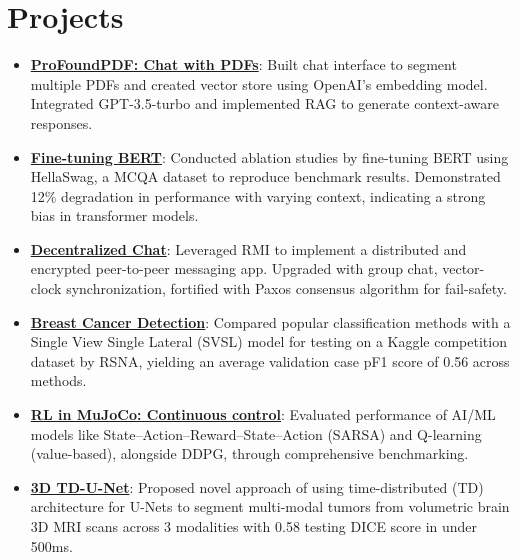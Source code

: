 \documentclass[letterpaper,10pt]{article}
\newcommand{\resumeItem}[2]{
    \item\small{
        \textbf{#1}{: #2 \vspace{-2pt}}
    }
}
\newcommand{\resumeSubItem}[2]{\resumeItem{#1}{#2}\vspace{-4pt}}
\newcommand{\resumeSubHeadingListStart}{\begin{itemize}[leftmargin=*]}
\newcommand{\resumeSubHeadingListEnd}{\end{itemize}}
\begin{document}
\section{Projects}
	\resumeSubHeadingListStart
		\resumeSubItem{\href{https://github.com/killerpanda101/ProfoundPDF}{ProFoundPDF: Chat with PDFs}}
			{Built chat interface to segment multiple PDFs and created vector store using OpenAI’s embedding model. Integrated GPT-3.5-turbo and implemented RAG to generate context-aware responses.}
		\resumeSubItem{\href{https://expo.baulab.info/2023-Fall/chandrakommineni/}{Fine-tuning BERT}}
			{Conducted ablation studies by fine-tuning BERT using HellaSwag, a MCQA dataset to reproduce benchmark results. Demonstrated 12\% degradation in performance with varying context, indicating a strong bias in transformer models.}
		\resumeSubItem{\href{https://github.com/chakrabortyde/decentralized-chat}{Decentralized Chat}}
			{Leveraged RMI to implement a distributed and encrypted peer-to-peer messaging app. Upgraded with group chat, vector-clock synchronization, fortified with Paxos consensus algorithm for fail-safety.}
		\resumeSubItem{\href{https://arxiv.org/abs/2307.11274}{Breast Cancer Detection}}
			{Compared popular classification methods with a Single View Single Lateral (SVSL) model for testing on a Kaggle competition dataset by RSNA, yielding an average validation case pF1 score of 0.56 across methods.}
		\resumeSubItem{\href{https://arxiv.org/abs/2307.11166}{RL in MuJoCo: Continuous control}}
			{Evaluated performance of AI/ML models like State–Action–Reward–State–Action (SARSA) and Q-learning (value-based), alongside DDPG, through comprehensive benchmarking.}
		\resumeSubItem{\href{https://link.springer.com/chapter/10.1007/978-981-13-9042-5_62}{3D TD-U-Net}}
			{Proposed novel approach of using time-distributed (TD) architecture for U-Nets to segment multi-modal tumors from volumetric brain 3D MRI scans across 3 modalities with 0.58 testing DICE score in under 500ms.}
	\resumeSubHeadingListEnd\texttt{}
\end{document}
